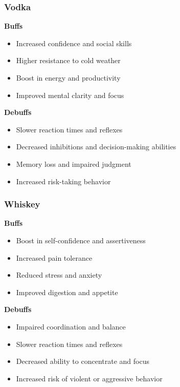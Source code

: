 \documentclass{book}
\begin{document}
\subsubsection{Vodka}
    \textbf{Buffs}
        \begin{itemize}
            \item Increased confidence and social skills
            \item Higher resistance to cold weather
            \item Boost in energy and productivity
            \item Improved mental clarity and focus
        \end{itemize}
    \textbf{Debuffs}
        \begin{itemize}
            \item Slower reaction times and reflexes
            \item Decreased inhibitions and decision-making abilities
            \item Memory loss and impaired judgment
            \item Increased risk-taking behavior
        \end{itemize}
\subsubsection{Whiskey}
    \textbf{Buffs}
        \begin{itemize}
            \item Boost in self-confidence and assertiveness
            \item Increased pain tolerance
            \item Reduced stress and anxiety
            \item Improved digestion and appetite
        \end{itemize}
    \textbf{Debuffs}
        \begin{itemize}
            \item Impaired coordination and balance
            \item Slower reaction times and reflexes
            \item Decreased ability to concentrate and focus
            \item Increased risk of violent or aggressive behavior
        \end{itemize}
\end{document}
